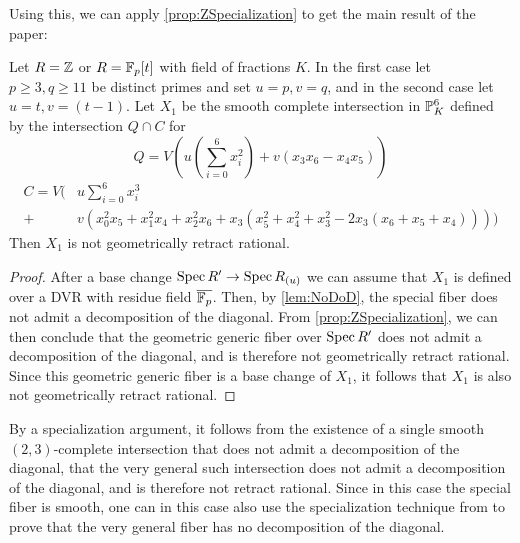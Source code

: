 Using this, we can apply \cref{prop:ZSpecialization} to get the main result of the paper:

\begin{theorem}
  Let $R=\Z$ or $R=\F_p[t]$ with field of fractions $K$. In the first case let $p \geq 3, q \geq 11$ be distinct primes and set $u=p, v=q$, and in the second case let $u=t,v=(t-1)$. Let $X_1$ be the smooth complete intersection in $\P^6_{K}$ defined by the intersection $Q \cap C$ for
\begin{equation*}
	\label{eq:Quadric3}
	Q = V\left( u \left(\sum_{i=0}^6 x_i^2 \right) + v(x_3x_6-x_4x_5)\right) 
\end{equation*}
\begin{align*}
		C = V\biggl( &u \sum_{i=0}^6 x_i^3 \\ + &v\left(x_0^2x_5 + x_1^2x_4 + x_2^2x_6 + x_3(x_5^2+x_4^2+x_3^2 -2x_3(x_6 + x_5 + x_4))\right) \biggr)
\end{align*}
Then $X_1$ is not geometrically retract rational.
\end{theorem}
\begin{proof}
	After a base change $\Spec R' \to \Spec R_{(u)}$ we can assume that $X_1$ is defined over a DVR with residue field $\overline{\F_p}$. Then, by \cref{lem:NoDoD}, the special fiber does not admit a decomposition of the diagonal. From \cref{prop:ZSpecialization}, we can then conclude that the geometric generic fiber over $\Spec R'$ does not admit a decomposition of the diagonal, and is therefore not geometrically retract rational. Since this geometric generic fiber is a base change of $X_1$, it follows that $X_1$ is also not geometrically retract rational.
\end{proof}

\begin{remark}
By a specialization argument, it follows from the existence of a single smooth $(2,3)$-complete intersection that does not admit a decomposition of the diagonal, that the very general such intersection does not admit a decomposition of the diagonal, and is therefore not retract rational. Since in this case the special fiber is smooth, one can in this case also use the specialization technique from \cite[Théorème 1.12]{ColliotThelenePirutka} to prove that the very general fiber has no decomposition of the diagonal.
\end{remark}

\printbibliography[heading = subbibliography]
\stopcontents[chapters]